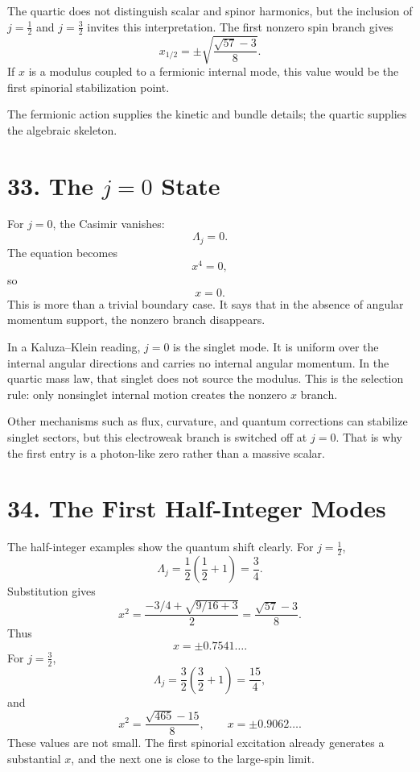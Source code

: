 \documentclass[11pt]{article}
\newcommand{\Lspin}{\Lambda_j}
\begin{document}
The quartic does not distinguish scalar and spinor harmonics, but the inclusion of \(j=\frac12\) and \(j=\frac32\) invites this interpretation. The first nonzero spin branch gives
\[
        x_{1/2}=
        \pm\sqrt{\frac{\sqrt{57}-3}{8}} .
\]
If \(x\) is a modulus coupled to a fermionic internal mode, this value would be the first spinorial stabilization point.

The fermionic action supplies the kinetic and bundle details; the quartic supplies the algebraic skeleton.


\section*{33. The \(j=0\) State}

For \(j=0\), the Casimir vanishes:
\[
        \Lspin=0 .
\]
The equation becomes
\[
        x^4=0 ,
\]
so
\[
        x=0 .
\]
This is more than a trivial boundary case. It says that in the absence of angular momentum support, the nonzero branch disappears.

In a Kaluza--Klein reading, \(j=0\) is the singlet mode. It is uniform over the internal angular directions and carries no internal angular momentum. In the quartic mass law, that singlet does not source the modulus. This is the selection rule: only nonsinglet internal motion creates the nonzero \(x\) branch.

Other mechanisms such as flux, curvature, and quantum corrections can stabilize singlet sectors, but this electroweak branch is switched off at \(j=0\). That is why the first entry is a photon-like zero rather than a massive scalar.


\section*{34. The First Half-Integer Modes}

The half-integer examples show the quantum shift clearly. For \(j=\frac12\),
\[
        \Lspin=\frac12\left(\frac12+1\right)=\frac34 .
\]
Substitution gives
\[
        x^2=\frac{-3/4+\sqrt{9/16+3}}{2}
        =\frac{\sqrt{57}-3}{8}.
\]
Thus
\[
        x=\pm 0.7541\ldots .
\]
For \(j=\frac32\),
\[
        \Lspin=\frac32\left(\frac32+1\right)=\frac{15}{4},
\]
and
\[
        x^2=\frac{\sqrt{465}-15}{8},
        \qquad
        x=\pm 0.9062\ldots .
\]
These values are not small. The first spinorial excitation already generates a substantial \(x\), and the next one is close to the large-spin limit.
\end{document}

